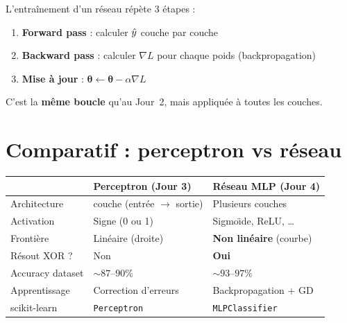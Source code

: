 \begin{retenirbox}
    L'entra\^{i}nement d'un r\'{e}seau r\'{e}p\`{e}te 3 \'{e}tapes :
    \begin{enumerate}
        \item \textbf{Forward pass} : calculer $\hat{y}$ couche par couche
        \item \textbf{Backward pass} : calculer $\nabla L$ pour chaque poids (backpropagation)
        \item \textbf{Mise \`{a} jour} : $\boldsymbol{\theta} \leftarrow \boldsymbol{\theta} - \alpha \nabla L$
    \end{enumerate}
    C'est la \textbf{m\^{e}me boucle} qu'au Jour~2, mais appliqu\'{e}e \`{a} toutes les couches.
\end{retenirbox}

\section{Comparatif : perceptron vs r\'{e}seau}

\begin{center}
\renewcommand{\arraystretch}{1.4}
\begin{tabularx}{\textwidth}{l >{\centering\arraybackslash}X >{\centering\arraybackslash}X}
    \toprule
    & \textbf{Perceptron (Jour 3)} & \textbf{R\'{e}seau MLP (Jour 4)} \\
    \midrule
    Architecture  & 1 couche (entr\'{e}e $\to$ sortie) & Plusieurs couches \\
    Activation    & Signe (0 ou 1) & Sigmo\"{\i}de, ReLU, \ldots \\
    Fronti\`{e}re & Lin\'{e}aire (droite) & \textbf{Non lin\'{e}aire} (courbe) \\
    R\'{e}sout XOR ? & Non & \textbf{Oui} \\
    Accuracy dataset & ${\sim}87$--$90\%$ & ${\sim}93$--$97\%$ \\
    Apprentissage & Correction d'erreurs & Backpropagation + GD \\
    scikit-learn  & \texttt{Perceptron} & \texttt{MLPClassifier} \\
    \bottomrule
\end{tabularx}
\end{center}

